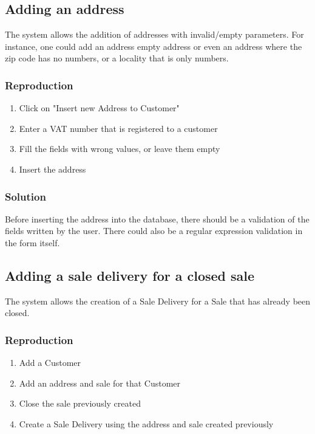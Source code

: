 \documentclass[12pt]{article}
\begin{document}
\subsection{Adding an address}
The system allows the addition of addresses with invalid/empty parameters. For instance, one could add an address empty address or even an address where the zip code has no numbers, or a locality that is only numbers.

\subsubsection{Reproduction}
\begin{enumerate}
   \item  Click on "Insert new Address to Customer"
   
   \item  Enter a VAT number that is registered to a customer
   
   \item  Fill the fields with wrong values, or leave them empty
   
   \item  Insert the address
\end{enumerate}


\subsubsection{Solution}
Before inserting the address into the database, there should be a validation of the fields written by the user. There could also be a regular expression validation in the form itself.
\newpage
\subsection{Adding a sale delivery for a closed sale}
The system allows the creation of a Sale Delivery for a Sale that has already been closed.

\subsubsection{Reproduction}
\begin{enumerate}
   \item  Add a Customer
   
   \item  Add an address and sale for that Customer
   
   \item  Close the sale previously created
   
   \item  Create a Sale Delivery using the address and sale created previously
\end{enumerate}
\end{document}
